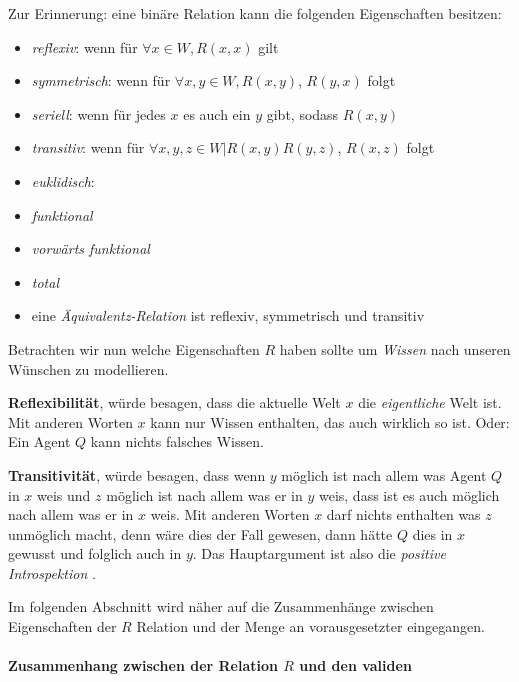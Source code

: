 Zur Erinnerung: eine binäre Relation kann die folgenden Eigenschaften besitzen:
\begin{itemize}
	\item \emph{reflexiv}: wenn für $\forall x \in W, R(x,x)$ gilt
	\item \emph{symmetrisch}: wenn für $\forall x,y \in W, R(x,y)$, $R(y,x)$ folgt
	\item \emph{seriell}: wenn für jedes $x$ es auch ein $y$ gibt, sodass $R(x,y)$
	\item \emph{transitiv}: wenn für $\forall x,y,z \in W | R(x,y) R(y,z)$, $R(x,z)$ folgt
	\item \emph{euklidisch}: 
	\item \emph{funktional}
	\item \emph{vorwärts funktional} 
	\item \emph{total}
	\item eine \emph{Äquivalentz-Relation} ist reflexiv, symmetrisch und transitiv
\end{itemize}

Betrachten wir nun welche Eigenschaften $R$ haben sollte um \emph{Wissen} nach unseren Wünschen zu modellieren.

\textbf{Reflexibilität}, würde besagen, dass die aktuelle Welt $x$ die \emph{eigentliche} Welt ist.
Mit anderen Worten $x$ kann nur Wissen enthalten, das auch wirklich so ist.
Oder: Ein Agent $Q$ kann nichts falsches Wissen.

\textbf{Transitivität}, würde besagen, dass wenn $y$ möglich ist nach allem was Agent $Q$ in $x$ weis und $z$ möglich ist nach allem was er in $y$ weis, dass ist es auch möglich nach allem was er in $x$ weis.
Mit anderen Worten $x$ darf nichts enthalten was $z$ unmöglich macht, denn wäre dies der Fall gewesen, dann hätte $Q$ dies in $x$ gewusst und folglich auch in $y$.
Das Hauptargument ist also die \emph{positive Introspektion} \vierFormel {}.

Im folgenden Abschnitt wird näher auf die Zusammenhänge zwischen Eigenschaften der $R$ Relation und der Menge an vorausgesetzter \formelSchemata eingegangen. 




\paragraph{Zusammenhang zwischen der Relation $R$ und den validen \formelSchemata}

